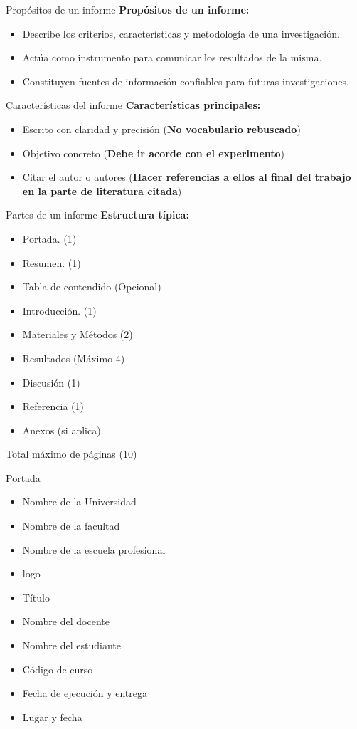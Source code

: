 \documentclass[
11pt, %
]{beamer}
\begin{document}
\begin{frame}{Propósitos de un informe}
	\textbf{Propósitos de un informe:}
	\begin{itemize}
		\item Describe los criterios, características y metodología de una investigación.
		\item Actúa como instrumento para comunicar los resultados de la misma.
		\item Constituyen fuentes de información confiables para futuras investigaciones.
	\end{itemize}
\end{frame}

\begin{frame}{Características del informe}
	\textbf{Características principales:}
	\begin{itemize}
		\item Escrito con claridad y precisión (\textbf{No vocabulario rebuscado})
		\item Objetivo concreto (\textbf{Debe ir acorde con el experimento})
		\item Citar el autor o autores (\textbf{Hacer referencias a ellos al final del trabajo en la parte de literatura citada})
	\end{itemize}
\end{frame}

\begin{frame}{Partes de un informe}
	\textbf{Estructura típica:}
	\begin{itemize}
		\item Portada. (1)
		\item Resumen. (1)
		\item Tabla de contendido (Opcional)
		\item Introducción. (1)
		\item Materiales y Métodos (2)
		\item Resultados (Máximo 4)
		\item Discusión (1)
		\item Referencia (1)
		\item Anexos (si aplica).
	\end{itemize}
	Total máximo de páginas (10)
\end{frame}

\begin{frame}{Portada}
	\begin{itemize}
		\item Nombre de la Universidad
		\item Nombre de la facultad
		\item Nombre de la escuela profesional
		\item logo
		\item Título
		\item Nombre del docente
		\item Nombre del estudiante
		\item Código de curso
		\item Fecha de ejecución y entrega
		\item Lugar y fecha
	\end{itemize}
\end{frame}
\end{document}
